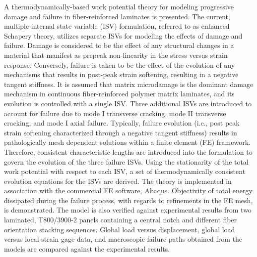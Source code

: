 A thermodynamically-based work potential theory for modeling progressive damage and failure in fiber-reinforced laminates is presented. The current, multiple-internal state variable (ISV) formulation, referred to as enhanced Schapery theory, utilizes separate ISVs for modeling the effects of damage and failure. Damage is considered to be the effect of any structural changes in a material that manifest as prepeak non-linearity in the stress versus strain response. Conversely, failure is taken to be the effect of the evolution of any mechanisms that results in post-peak strain softening, resulting in a negative tangent stiffness. It is assumed that matrix microdamage is the dominant damage mechanism in continuous fiber-reinforced polymer matrix laminates, and its evolution is controlled with a single ISV. Three additional ISVs are introduced to account for failure due to mode I transverse cracking, mode II transverse cracking, and mode I axial failure. Typically, failure evolution (i.e., post peak strain softening characterized through a negative tangent stiffness) results in pathologically mesh dependent solutions within a finite element (FE) framework. Therefore, consistent characteristic lengths are introduced into the formulation to govern the evolution of the three failure ISVs. Using the stationarity of the total work potential with respect to each ISV, a set of thermodynamically consistent evolution equations for the ISVs are derived. The theory is implemented in association with the commercial FE software, Abaqus. Objectivity of total energy dissipated during the failure process, with regards to refinements in the FE mesh, is demonstrated. The model is also verified against experimental results from two laminated, T800/3900-2 panels containing a central notch and different fiber orientation stacking sequences. Global load versus displacement, global load versus local strain gage data, and macroscopic failure paths obtained from the models are compared against the experimental results. \cite{pineda2009progressive,hadden2015mechanical,bednarcyk2015meso,pineda2013numerical}

